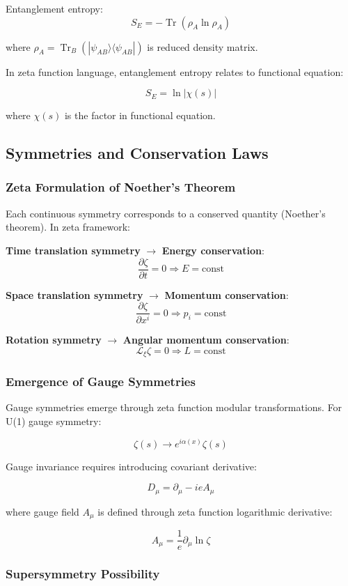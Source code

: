 \documentclass[12pt,a4paper]{article}
\DeclareMathOperator{\Tr}{Tr}
\begin{document}
Entanglement entropy:
$$S_E = -\Tr(\rho_A \ln \rho_A)$$

where $\rho_A = \Tr_B(|\psi_{AB}\rangle \langle \psi_{AB}|)$ is reduced density matrix.

In zeta function language, entanglement entropy relates to functional equation:

$$S_E = \ln |\chi(s)|$$

where $\chi(s)$ is the factor in functional equation.

\subsection{Symmetries and Conservation Laws}

\subsubsection{Zeta Formulation of Noether's Theorem}

Each continuous symmetry corresponds to a conserved quantity (Noether's theorem). In zeta framework:

\textbf{Time translation symmetry} $\to$ \textbf{Energy conservation}:
$$\frac{\partial \zeta}{\partial t} = 0 \Rightarrow E = \text{const}$$

\textbf{Space translation symmetry} $\to$ \textbf{Momentum conservation}:
$$\frac{\partial \zeta}{\partial x^i} = 0 \Rightarrow p_i = \text{const}$$

\textbf{Rotation symmetry} $\to$ \textbf{Angular momentum conservation}:
$$\mathcal{L}_{\xi} \zeta = 0 \Rightarrow L = \text{const}$$

\subsubsection{Emergence of Gauge Symmetries}

Gauge symmetries emerge through zeta function modular transformations. For U(1) gauge symmetry:

$$\zeta(s) \to e^{i\alpha(x)} \zeta(s)$$

Gauge invariance requires introducing covariant derivative:

$$D_{\mu} = \partial_{\mu} - ieA_{\mu}$$

where gauge field $A_{\mu}$ is defined through zeta function logarithmic derivative:

$$A_{\mu} = \frac{1}{e} \partial_{\mu} \ln \zeta$$

\subsubsection{Supersymmetry Possibility}
\end{document}
